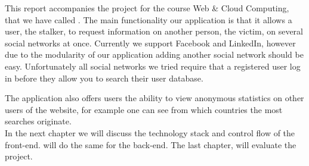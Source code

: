 
This report accompanies the project for the course Web \& Cloud Computing, that we have called \stalker. The main functionality our application \stalker is that it allows a user, the stalker, to request information on another person, the victim, on several social networks at once. Currently we support Facebook and LinkedIn, however due to the modularity of our application adding another social network should be easy. Unfortunately all social networks we tried require that a registered user log in before they allow you to search their user database.

The application also offers users the ability to view anonymous statistics on other users of the website, for example one can see from which countries the most searches originate. \\

In the next chapter we will discuss the technology stack and control flow of the front-end.  will do the same for the back-end. The last chapter, will evaluate the project. 

